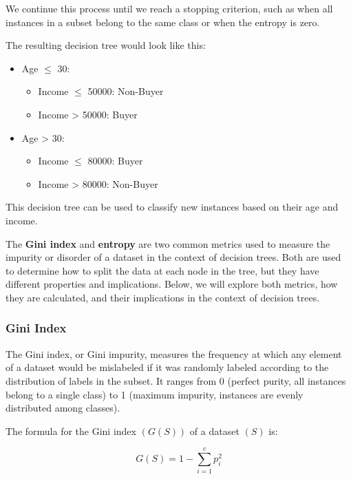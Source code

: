 \documentclass[12pt]{book}
\providecommand{\tightlist}{%
  \setlength{\itemsep}{0pt}\setlength{\parskip}{0pt}}
\begin{document}
We continue this process until we reach a stopping criterion, such as
when all instances in a subset belong to the same class or when the
entropy is zero.

The resulting decision tree would look like this:

\begin{itemize}
\tightlist
\item
  Age \(\le\) 30:

  \begin{itemize}
  \tightlist
  \item
    Income \(\le\) 50000: Non-Buyer
  \item
    Income \textgreater{} 50000: Buyer
  \end{itemize}
\item
  Age \textgreater{} 30:

  \begin{itemize}
  \tightlist
  \item
    Income \(\le\) 80000: Buyer
  \item
    Income \textgreater{} 80000: Non-Buyer
  \end{itemize}
\end{itemize}

This decision tree can be used to classify new instances based on their
age and income.

The \textbf{Gini index} and \textbf{entropy} are two common metrics used
to measure the impurity or disorder of a dataset in the context of
decision trees. Both are used to determine how to split the data at each
node in the tree, but they have different properties and implications.
Below, we will explore both metrics, how they are calculated, and their
implications in the context of decision trees.

\subsubsection{Gini Index}\label{gini-index}

The Gini index, or Gini impurity, measures the frequency at which any
element of a dataset would be mislabeled if it was randomly labeled
according to the distribution of labels in the subset. It ranges from 0
(perfect purity, all instances belong to a single class) to 1 (maximum
impurity, instances are evenly distributed among classes).

The formula for the Gini index \(( G(S) )\) of a dataset \(( S )\) is:

\[
G(S) = 1 - \sum_{i=1}^{c} p_i^2
\]
\end{document}
